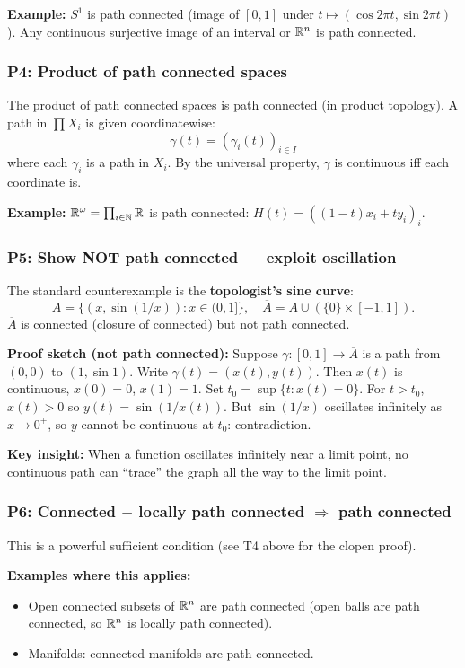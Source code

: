 \documentclass{article}
\begin{document}
\textbf{Example:} $S^1$ is path connected (image of $[0,1]$ under
$t \mapsto (\cos 2\pi t, \sin 2\pi t)$). Any continuous surjective
image of an interval or $\mathbb{R}^n$ is path connected.

\subsubsection*{P4: Product of path connected spaces}
The product of path connected spaces is path connected (in product
topology). A path in $\prod X_i$ is given coordinatewise:
\[
  \gamma(t) = (\gamma_i(t))_{i \in I}
\]
where each $\gamma_i$ is a path in $X_i$. By the universal property,
$\gamma$ is continuous iff each coordinate is.

\textbf{Example:} $\mathbb{R}^\omega = \prod_{i \in \mathbb{N}} \mathbb{R}$ is path connected:
$H(t) = ((1-t)x_i + ty_i)_i$.

\subsubsection*{P5: Show NOT path connected --- exploit oscillation}
The standard counterexample is the \textbf{topologist's sine curve}:
\[
  A = \{(x, \sin(1/x)) : x \in (0,1]\}, \quad \overline{A} = A \cup
  (\{0\} \times [-1,1]).
\]
$\overline{A}$ is connected (closure of connected) but not path connected.

\textbf{Proof sketch (not path connected):} Suppose $\gamma : [0,1] \to
\overline{A}$ is a path from $(0,0)$ to $(1, \sin 1)$.
Write $\gamma(t) = (x(t), y(t))$. Then $x(t)$ is continuous, $x(0) = 0$,
$x(1) = 1$. Set $t_0 = \sup\{t : x(t) = 0\}$. For $t > t_0$,
$x(t) > 0$ so $y(t) = \sin(1/x(t))$. But $\sin(1/x)$ oscillates
infinitely as $x \to 0^+$, so $y$ cannot be continuous at $t_0$:
contradiction.

\textbf{Key insight:} When a function oscillates infinitely near a limit
point, no continuous path can ``trace'' the graph all the way to the
limit point.

\subsubsection*{P6: Connected $+$ locally path connected
$\Rightarrow$ path connected}
This is a powerful sufficient condition (see T4 above for the clopen proof).

\textbf{Examples where this applies:}
\begin{itemize}
  \item Open connected subsets of $\mathbb{R}^n$ are path connected (open balls
    are path connected, so $\mathbb{R}^n$ is locally path connected).
  \item Manifolds: connected manifolds are path connected.
\end{itemize}
\end{document}
